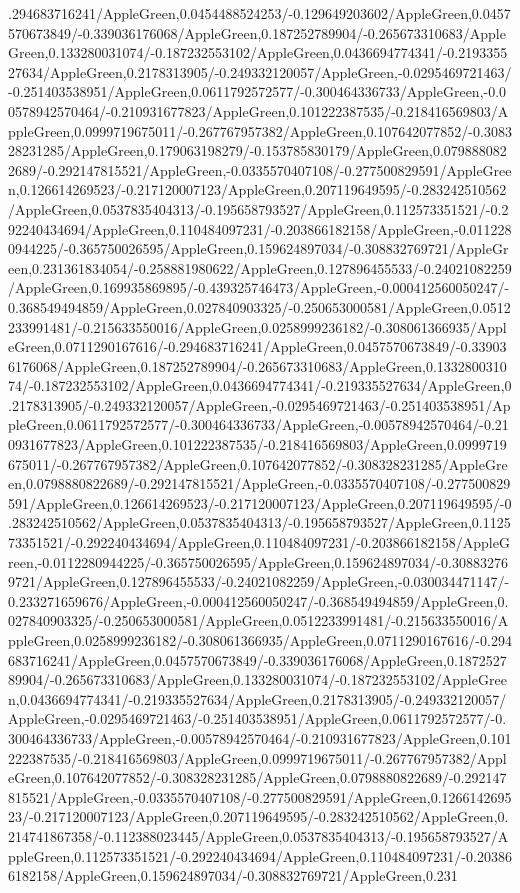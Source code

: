 {\begin{tikzternal}
{.294683716241/AppleGreen,0.0454488524253/-0.129649203602/AppleGreen,0.0457570673849/-0.339036176068/AppleGreen,0.187252789904/-0.265673310683/AppleGreen,0.133280031074/-0.187232553102/AppleGreen,0.0436694774341/-0.219335527634/AppleGreen,0.2178313905/-0.249332120057/AppleGreen,-0.0295469721463/-0.251403538951/AppleGreen,0.0611792572577/-0.300464336733/AppleGreen,-0.00578942570464/-0.210931677823/AppleGreen,0.101222387535/-0.218416569803/AppleGreen,0.0999719675011/-0.267767957382/AppleGreen,0.107642077852/-0.308328231285/AppleGreen,0.179063198279/-0.153785830179/AppleGreen,0.0798880822689/-0.292147815521/AppleGreen,-0.0335570407108/-0.277500829591/AppleGreen,0.126614269523/-0.217120007123/AppleGreen,0.207119649595/-0.283242510562/AppleGreen,0.0537835404313/-0.195658793527/AppleGreen,0.112573351521/-0.292240434694/AppleGreen,0.110484097231/-0.203866182158/AppleGreen,-0.0112280944225/-0.365750026595/AppleGreen,0.159624897034/-0.308832769721/AppleGreen,0.231361834054/-0.258881980622/AppleGreen,0.127896455533/-0.24021082259/AppleGreen,0.169935869895/-0.439325746473/AppleGreen,-0.000412560050247/-0.368549494859/AppleGreen,0.027840903325/-0.250653000581/AppleGreen,0.0512233991481/-0.215633550016/AppleGreen,0.0258999236182/-0.308061366935/AppleGreen,0.0711290167616/-0.294683716241/AppleGreen,0.0457570673849/-0.339036176068/AppleGreen,0.187252789904/-0.265673310683/AppleGreen,0.133280031074/-0.187232553102/AppleGreen,0.0436694774341/-0.219335527634/AppleGreen,0.2178313905/-0.249332120057/AppleGreen,-0.0295469721463/-0.251403538951/AppleGreen,0.0611792572577/-0.300464336733/AppleGreen,-0.00578942570464/-0.210931677823/AppleGreen,0.101222387535/-0.218416569803/AppleGreen,0.0999719675011/-0.267767957382/AppleGreen,0.107642077852/-0.308328231285/AppleGreen,0.0798880822689/-0.292147815521/AppleGreen,-0.0335570407108/-0.277500829591/AppleGreen,0.126614269523/-0.217120007123/AppleGreen,0.207119649595/-0.283242510562/AppleGreen,0.0537835404313/-0.195658793527/AppleGreen,0.112573351521/-0.292240434694/AppleGreen,0.110484097231/-0.203866182158/AppleGreen,-0.0112280944225/-0.365750026595/AppleGreen,0.159624897034/-0.308832769721/AppleGreen,0.127896455533/-0.24021082259/AppleGreen,-0.030034471147/-0.233271659676/AppleGreen,-0.000412560050247/-0.368549494859/AppleGreen,0.027840903325/-0.250653000581/AppleGreen,0.0512233991481/-0.215633550016/AppleGreen,0.0258999236182/-0.308061366935/AppleGreen,0.0711290167616/-0.294683716241/AppleGreen,0.0457570673849/-0.339036176068/AppleGreen,0.187252789904/-0.265673310683/AppleGreen,0.133280031074/-0.187232553102/AppleGreen,0.0436694774341/-0.219335527634/AppleGreen,0.2178313905/-0.249332120057/AppleGreen,-0.0295469721463/-0.251403538951/AppleGreen,0.0611792572577/-0.300464336733/AppleGreen,-0.00578942570464/-0.210931677823/AppleGreen,0.101222387535/-0.218416569803/AppleGreen,0.0999719675011/-0.267767957382/AppleGreen,0.107642077852/-0.308328231285/AppleGreen,0.0798880822689/-0.292147815521/AppleGreen,-0.0335570407108/-0.277500829591/AppleGreen,0.126614269523/-0.217120007123/AppleGreen,0.207119649595/-0.283242510562/AppleGreen,0.214741867358/-0.112388023445/AppleGreen,0.0537835404313/-0.195658793527/AppleGreen,0.112573351521/-0.292240434694/AppleGreen,0.110484097231/-0.203866182158/AppleGreen,0.159624897034/-0.308832769721/AppleGreen,0.231}
\end{tikzternal}}
